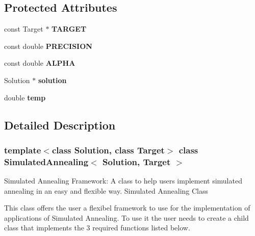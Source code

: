 \subsection*{Protected Attributes}
\begin{DoxyCompactItemize}
\item 
\hypertarget{class_simulated_annealing_a3a99f59868ff266a911878145366e8f4}{
const Target $\ast$ {\bfseries TARGET}}
\label{class_simulated_annealing_a3a99f59868ff266a911878145366e8f4}

\item 
\hypertarget{class_simulated_annealing_aaab6fccd2041ded2a46977c660422028}{
const double {\bfseries PRECISION}}
\label{class_simulated_annealing_aaab6fccd2041ded2a46977c660422028}

\item 
\hypertarget{class_simulated_annealing_aaf095d1d6ccbd087cdc57db55c373757}{
const double {\bfseries ALPHA}}
\label{class_simulated_annealing_aaf095d1d6ccbd087cdc57db55c373757}

\item 
\hypertarget{class_simulated_annealing_a596a28b06c9975726d7838ee78cd1057}{
Solution $\ast$ {\bfseries solution}}
\label{class_simulated_annealing_a596a28b06c9975726d7838ee78cd1057}

\item 
\hypertarget{class_simulated_annealing_ae9d10c485a87ba97ffbc36351c1a762b}{
double {\bfseries temp}}
\label{class_simulated_annealing_ae9d10c485a87ba97ffbc36351c1a762b}

\end{DoxyCompactItemize}


\subsection{Detailed Description}
\subsubsection*{template$<$class Solution, class Target$>$ class SimulatedAnnealing$<$ Solution, Target $>$}

Simulated Annealing Framework: A class to help users implement simulated annealing in an easy and flexible way. Simulated Annealing Class

This class offers the user a flexibel framework to use for the implementation of applications of Simulated Annealing. To use it the user needs to create a child class that implements the 3 required functions listed below.

